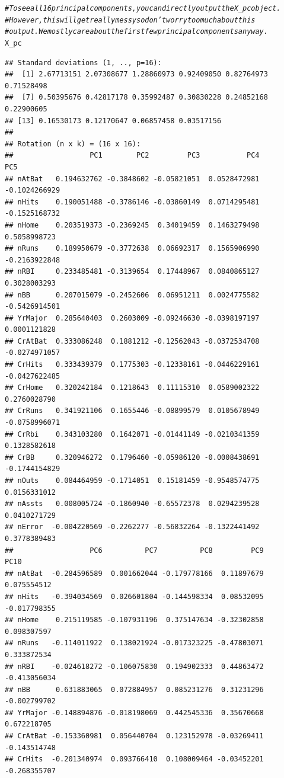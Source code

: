 \documentclass{article}\usepackage[]{graphicx}\usepackage[]{color}
\makeatletter
\newcommand{\hlcom}[1]{\textcolor[rgb]{0.678,0.584,0.686}{\textit{#1}}}%
\newcommand{\hlstd}[1]{\textcolor[rgb]{0.345,0.345,0.345}{#1}}%
\newenvironment{kframe}{%
 \def\at@end@of@kframe{}%
 \ifinner\ifhmode%
  \def\at@end@of@kframe{\end{minipage}}%
  \begin{minipage}{\columnwidth}%
 \fi\fi%
 \def\FrameCommand##1{\hskip\@totalleftmargin \hskip-\fboxsep
 \colorbox{shadecolor}{##1}\hskip-\fboxsep
     \hskip-\linewidth \hskip-\@totalleftmargin \hskip\columnwidth}%
 \MakeFramed {\advance\hsize-\width
   \@totalleftmargin\z@ \linewidth\hsize
   \@setminipage}}%
 {\par\unskip\endMakeFramed%
 \at@end@of@kframe}
\newenvironment{knitrout}{}{} %
\makeatother
\begin{document}
\begin{knitrout}
\begin{kframe}
\begin{alltt}
\hlcom{# To see all 16 principal components, you can directly output the X_pc object.}
\hlcom{# However, this will get really messy so don't worry too much about this}
\hlcom{# output. We mostly care about the first few principal components anyway.}
\hlstd{X_pc}
\end{alltt}
\begin{verbatim}
## Standard deviations (1, .., p=16):
##  [1] 2.67713151 2.07308677 1.28860973 0.92409050 0.82764973 0.71528498
##  [7] 0.50395676 0.42817178 0.35992487 0.30830228 0.24852168 0.22900605
## [13] 0.16530173 0.12170647 0.06857458 0.03517156
## 
## Rotation (n x k) = (16 x 16):
##                  PC1        PC2         PC3           PC4           PC5
## nAtBat   0.194632762 -0.3848602 -0.05821051  0.0528472981 -0.1024266929
## nHits    0.190051488 -0.3786146 -0.03860149  0.0714295481 -0.1525168732
## nHome    0.203519373 -0.2369245  0.34019459  0.1463279498  0.5058998723
## nRuns    0.189950679 -0.3772638  0.06692317  0.1565906990 -0.2163922848
## nRBI     0.233485481 -0.3139654  0.17448967  0.0840865127  0.3028003293
## nBB      0.207015079 -0.2452606  0.06951211  0.0024775582 -0.5426914501
## YrMajor  0.285640403  0.2603009 -0.09246630 -0.0398197197  0.0001121828
## CrAtBat  0.333086248  0.1881212 -0.12562043 -0.0372534708 -0.0274971057
## CrHits   0.333439379  0.1775303 -0.12338161 -0.0446229161 -0.0427622485
## CrHome   0.320242184  0.1218643  0.11115310  0.0589002322  0.2760028790
## CrRuns   0.341921106  0.1655446 -0.08899579  0.0105678949 -0.0758996071
## CrRbi    0.343103280  0.1642071 -0.01441149 -0.0210341359  0.1328582618
## CrBB     0.320946272  0.1796460 -0.05986120 -0.0008438691 -0.1744154829
## nOuts    0.084464959 -0.1714051  0.15181459 -0.9548574775  0.0156331012
## nAssts   0.008005724 -0.1860940 -0.65572378  0.0294239528  0.0410271729
## nError  -0.004220569 -0.2262277 -0.56832264 -0.1322441492  0.3778389483
##                  PC6          PC7          PC8         PC9         PC10
## nAtBat  -0.284596589  0.001662044 -0.179778166  0.11897679  0.075554512
## nHits   -0.394034569  0.026601804 -0.144598334  0.08532095 -0.017798355
## nHome    0.215119585 -0.107931196  0.375147634 -0.32302858  0.098307597
## nRuns   -0.114011922  0.138021924 -0.017323225 -0.47803071  0.333872534
## nRBI    -0.024618272 -0.106075830  0.194902333  0.44863472 -0.413056034
## nBB      0.631883065  0.072884957  0.085231276  0.31231296 -0.002799702
## YrMajor -0.148894876 -0.018198069  0.442545336  0.35670668  0.672218705
## CrAtBat -0.153360981  0.056440704  0.123152978 -0.03269411 -0.143514748
## CrHits  -0.201340974  0.093766410  0.108009464 -0.03452201 -0.268355707

\end{verbatim}
\end{kframe}
\end{knitrout}
\end{document}
